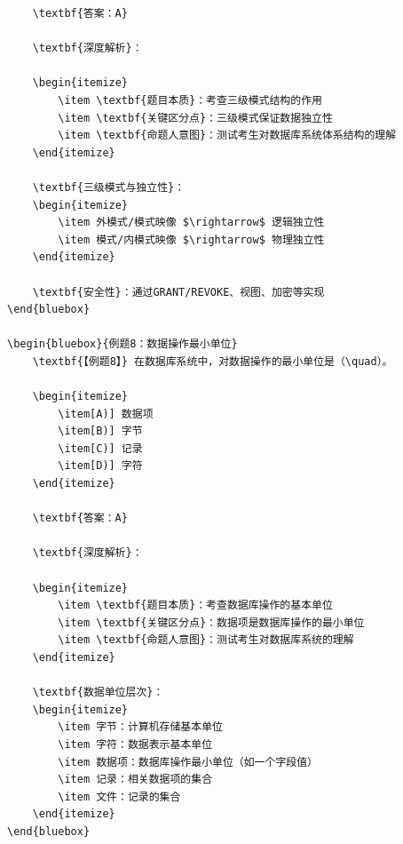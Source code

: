 \documentclass[12pt, a4paper]{article}
\newenvironment{bluebox}[1]{%
  \begin{trivlist}
  \item[\hskip\labelsep \textbf{#1}]
  \setlength{\parskip}{0.5ex}
  \setlength{\itemsep}{0.5ex}
}{%
  \end{trivlist}
}
\begin{document}
\begin{bluebox}{用户管理}
\begin{enumerate}[leftmargin=*, label=\textbf{\arabic*.}]
\begin{verbatim}
	\textbf{答案：A}

	\textbf{深度解析}：

	\begin{itemize}
		\item \textbf{题目本质}：考查三级模式结构的作用
		\item \textbf{关键区分点}：三级模式保证数据独立性
		\item \textbf{命题人意图}：测试考生对数据库系统体系结构的理解
	\end{itemize}

	\textbf{三级模式与独立性}：
	\begin{itemize}
		\item 外模式/模式映像 $\rightarrow$ 逻辑独立性
		\item 模式/内模式映像 $\rightarrow$ 物理独立性
	\end{itemize}

	\textbf{安全性}：通过GRANT/REVOKE、视图、加密等实现
\end{bluebox}

\begin{bluebox}{例题8：数据操作最小单位}
	\textbf{【例题8】} 在数据库系统中，对数据操作的最小单位是（\quad）。

	\begin{itemize}
		\item[A)] 数据项
		\item[B)] 字节
		\item[C)] 记录
		\item[D)] 字符
	\end{itemize}

	\textbf{答案：A}

	\textbf{深度解析}：

	\begin{itemize}
		\item \textbf{题目本质}：考查数据库操作的基本单位
		\item \textbf{关键区分点}：数据项是数据库操作的最小单位
		\item \textbf{命题人意图}：测试考生对数据库系统的理解
	\end{itemize}

	\textbf{数据单位层次}：
	\begin{itemize}
		\item 字节：计算机存储基本单位
		\item 字符：数据表示基本单位
		\item 数据项：数据库操作最小单位（如一个字段值）
		\item 记录：相关数据项的集合
		\item 文件：记录的集合
	\end{itemize}
\end{bluebox}


\end{verbatim}
\end{enumerate}
\end{bluebox}
\end{document}
